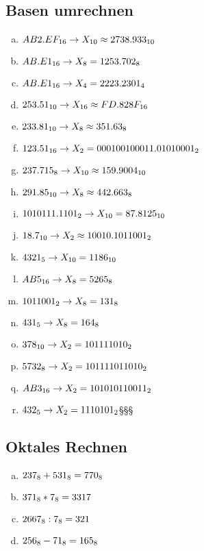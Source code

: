 \documentclass[12pt, a4paper, oneside]{article}
\begin{document}
\subsection{Basen umrechnen}
\begin{enumerate}[a.)]
  \item $AB2.EF_{16} \rightarrow X_{10} \hfill \approx 2738.933_{10}$
  \item $AB.E1_{16} \rightarrow X_{8} \hfill = 1253.702_{8}$ 
  \item $AB.E1_{16} \rightarrow X_{4} \hfill = 2223.2301_{4}$
  \item $253.51_{10} \rightarrow X_{16} \hfill \approx FD.828F_{16}$
  \item $233.81_{10} \rightarrow X_{8} \hfill \approx 351.63_{8}$
  \item $123.51_{16} \rightarrow X_{2} \hfill = 0001 0010 0011.0101 0001_{2}$
  \item $237.715_{8} \rightarrow X_{10} \hfill \approx 159.9004_{10}$
  \item $291.85_{10} \rightarrow X_{8} \hfill \approx 442.663_{8}$
  \item $101 0111.1101_{2} \rightarrow X_{10} \hfill = 87.8125_{10}$
  \item $18.7_{10} \rightarrow X_{2} \hfill \approx 1 0010.1011001_{2}$
  \item $4321_{5} \rightarrow X_{10} \hfill = 1186_{10}$
  \item $AB5_{16} \rightarrow X_{8} \hfill = 5265_{8}$
  \item $1011001_{2} \rightarrow X_{8} \hfill = 131_{8}$
  \item $431_{5} \rightarrow X_{8} \hfill = 164_{8}$
  \item $378_{10} \rightarrow X_{2} \hfill = 101111010_{2}$
  \item $5732_{8} \rightarrow X_{2} \hfill = 101111011010_{2}$
  \item $AB3_{16} \rightarrow X_{2} \hfill = 101010110011_{2}$
  \item $432_{5} \rightarrow X_{2} \hfill = 1110101_{2}$§§§
\end{enumerate}

\subsection{Oktales Rechnen}
\begin{enumerate}[a.)]
  \item $237_{8} + 531_{8} \hfill = 770_{8}$ 
  \item $371_{8} * 7_{8} \hfill = 3317$
  \item $2667_{8} : 7_{8} \hfill = 321$
  \item $256_{8} - 71_{8} \hfill = 165_{8}$
\end{enumerate}
\end{document}
